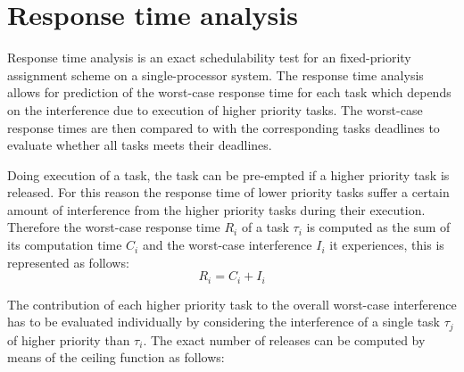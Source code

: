 \section{Response time analysis}
Response time analysis is an exact schedulability test for an fixed-priority  assignment scheme on a single-processor system. 
The response time analysis allows for prediction of the worst-case response time for each task which depends on the interference due to execution of higher priority tasks. 
The worst-case response times are then compared to with the corresponding tasks deadlines to evaluate whether all tasks meets their deadlines. 

Doing execution of a task, the task can be pre-empted if a higher priority task is released. 
For this reason the response time of lower priority tasks suffer a certain amount of interference from the higher priority tasks during their execution. 
Therefore the worst-case response time $R_i$ of a task $\tau_i$ is computed as the sum of its computation time $C_i$ and the worst-case interference $I_i$ it experiences, this is represented as follows:
\begin{equation}
R_i = C_i + I_i
\end{equation}

The contribution of each higher priority task to the overall worst-case interference has to be evaluated individually by considering the interference of a single task $\tau_j$ of higher priority than $\tau_i$.
The exact number of releases can be computed by means of the ceiling function as follows:
\begin{equation}

\end{equation}